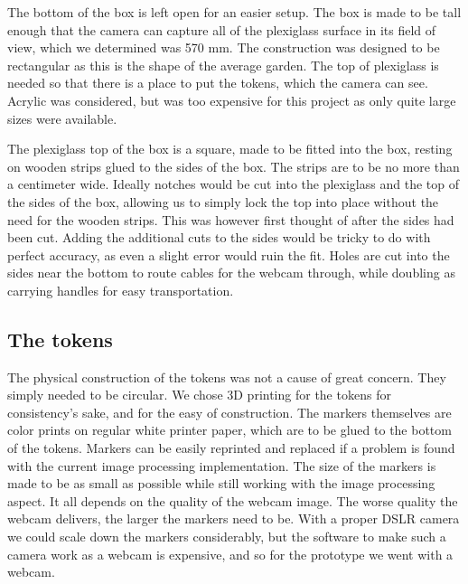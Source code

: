 The bottom of the box is left open for an easier setup.
The box is made to be tall enough that the camera can capture all of the plexiglass surface in its field of view, which we determined was 570 mm.
The construction was designed to be rectangular as this is the shape of the average garden. %
The top of plexiglass is needed so that there is a place to put the tokens, which the camera can see. Acrylic was considered, but was too expensive for this project as only quite large sizes were available.

The plexiglass top of the box is a square, made to be fitted into the box, resting on wooden strips glued to the sides of the box. The strips are to be no more than a centimeter wide. Ideally notches would be cut into the plexiglass and the top of the sides of the box, allowing us to simply lock the top into place without the need for the wooden strips. This was however first thought of after the sides had been cut. Adding the additional cuts to the sides would be tricky to do with perfect accuracy, as even a slight error would ruin the fit. 
Holes are cut into the sides near the bottom to route cables for the webcam through, while doubling as carrying handles for easy transportation. 

\subsection{The tokens}

The physical construction of the tokens was not a cause of great concern. They simply needed to be circular. We chose 3D printing for the tokens for consistency's sake, and for the easy of construction. The markers themselves are color prints on regular white printer paper, which are to be glued to the bottom of the tokens. Markers can be easily reprinted and replaced if a problem is found with the current image processing implementation. 
The size of the markers is made to be as small as possible while still working with the image processing aspect. It all depends on the quality of the webcam image. The worse quality the webcam delivers, the larger the markers need to be. With a proper DSLR camera we could scale down the markers considerably, but the software to make such a camera work as a webcam is expensive, and so for the prototype we went with a webcam.

